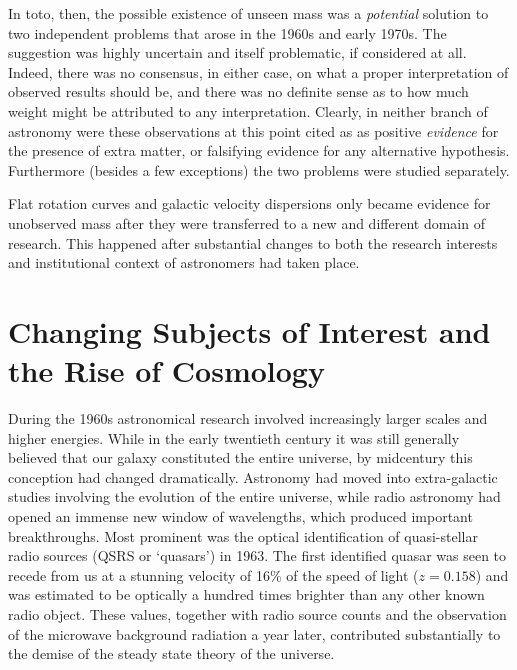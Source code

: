 \documentclass{naturefig}
\begin{document}
In toto, then, the possible existence of unseen mass was a \textit{potential} solution to two independent problems that arose in the 1960s and early 1970s. The suggestion was highly uncertain and itself problematic, if considered at all. Indeed, there was no consensus, in either case, on what a proper interpretation of observed results should be, and there was no definite sense as to how much weight might be attributed to any interpretation. Clearly, in neither branch of astronomy were these observations at this point cited as as positive \textit{evidence} for the presence of extra matter, or falsifying evidence for any alternative hypothesis. Furthermore (besides a few exceptions)\cite{Schwarzschild1954,Finzi1963} the two problems were studied separately.

Flat rotation curves and galactic velocity dispersions only became evidence for unobserved mass after they were transferred to a new and different domain of research. This happened after substantial changes to both the research interests and institutional context of astronomers had taken place.

\vspace{8pt}

\section*{Changing Subjects of Interest and the Rise of Cosmology}

During the 1960s astronomical research involved increasingly larger scales and higher energies. While in the early twentieth century it was still generally believed that our galaxy constituted the entire universe, by midcentury this conception had changed dramatically. Astronomy had moved into extra-galactic studies involving the evolution of the entire universe,\cite{Smith2008a,Smith2009} while radio astronomy had opened an immense new window of wavelengths, which produced important breakthroughs.\cite{Roberts1965} Most prominent was the optical identification of quasi-stellar radio sources (QSRS or `quasars') in 1963.
The first identified quasar was seen to recede from us at a stunning velocity of 16\% of the speed of light ($z=0.158$) and was estimated to be optically a hundred times brighter than any other known radio object.\cite{Schmidt1963} These values, together with radio source counts and the observation of the microwave background radiation a year later, contributed substantially to the demise of the steady state theory of the universe.\cite{Kragh2006}
\end{document}
